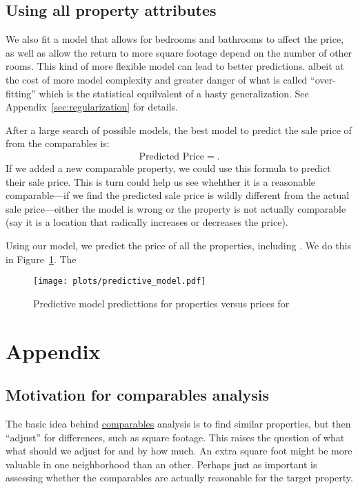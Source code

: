 \documentclass[
12pt, %
letterpaper, %
oneside, %
headinclude,footinclude, %
BCOR5mm, %
]{scrartcl}
\begin{document}
\subsection{Using all property attributes}
We also fit a model that allows for bedrooms and bathrooms to affect the price, as well as allow the return to more square footage depend on the number of other rooms.
This kind of more flexible model can lead to better predictions. albeit at the cost of more model complexity and greater danger of what is called ``over-fitting'' which is the statistical equilvalent of a hasty generalization.
See Appendix~\ref{sec:regularization} for details. 

After a large search of possible models, the best model to predict the sale price of \PropertyName{} from the comparables is: 
\begin{align}
\mbox{Predicted Price} = .
\end{align}
If we added a new comparable property, we could use this formula to predict their sale price.
This is turn could help us see whehther it is a reasonable comparable---if we find the predicted sale price is wildly different from the actual sale price---either the model is wrong or the property is not actually comparable (say it is a location that radically increases or decreases the price). 

Using our model, we predict the price of all the properties, including \PropertyName{}.
We do this in Figure~\ref{fig:predictive_model}.
The 

\begin{figure}
\centering
\caption{Predictive model predicttions for properties versus prices for \PropertyName{}} \label{fig:predictive_model}  
\texttt{[image: plots/predictive\_model.pdf]} 
\end{figure}

\renewcommand{\refname}{\spacedlowsmallcaps{References}} %



\appendix

\section{Appendix} 

\subsection{Motivation for comparables analysis} \label{sec:methods}
The basic idea behind \href{https://en.wikipedia.org/wiki/Comparables}{comparables} analysis is to find similar properties, but then ``adjust'' for differences, such as square footage.
This raises the question of what what should we adjust for and by how much.
An extra square foot might be more valuable in one neighborhood than an other. 
Perhaps just as important is assessing whether the comparables are actually reasonable for the target property. 
\end{document}

